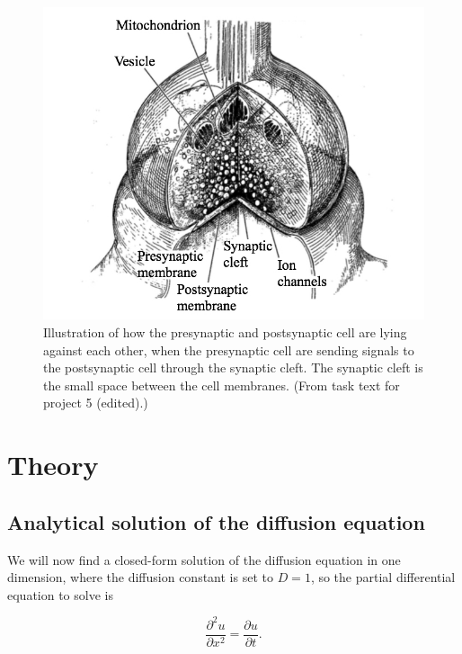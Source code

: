 \documentclass[12pt]{article}
\begin{document}
\begin{flushleft}
\begin{figure}[!h]
\begin{center}
\includegraphics[scale=0.33]{cell2}
\caption{\label{fig:cell}Illustration of how the presynaptic and postsynaptic cell are lying against each other, when the presynaptic cell are sending signals to the postsynaptic cell through the synaptic cleft. The synaptic cleft is the small space between the cell membranes. (From task text for project 5 (edited).)}
\end{center}
\end{figure}

\newpage
\section{Theory}
\subsection{Analytical solution of the diffusion equation\label{sect:analytical_solution}}
We will now find a closed-form solution of the diffusion equation in one dimension, where the diffusion constant is set to $D = 1$, so the partial differential equation to solve is 

\vspace{5mm}
\begin{equation}\label{eq:diffusion_1d}
\frac{\partial^2 u}{\partial x^2} = \frac{\partial u}{\partial t}.
\end{equation}
\vspace{5mm} 


\end{flushleft}
\end{document}
